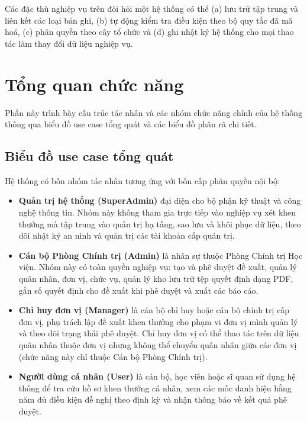 \documentclass[../DoAn.tex]{subfiles}
\begin{document}
Các đặc thù nghiệp vụ trên đòi hỏi một hệ thống có thể (a) lưu trữ tập trung và liên kết các loại bản ghi, (b) tự động kiểm tra điều kiện theo bộ quy tắc đã mã hoá, (c) phân quyền theo cây tổ chức và (d) ghi nhật ký hệ thống cho mọi thao tác làm thay đổi dữ liệu nghiệp vụ.

\section{Tổng quan chức năng}
\label{section:2.2}

Phần này trình bày cấu trúc tác nhân và các nhóm chức năng chính của hệ thống thông qua biểu đồ use case tổng quát và các biểu đồ phân rã chi tiết.

\subsection{Biểu đồ use case tổng quát}
\label{subsection:2.2.1}

Hệ thống có bốn nhóm tác nhân tương ứng với bốn cấp phân quyền nội bộ:

\begin{itemize}
    \item \textbf{Quản trị hệ thống (SuperAdmin)} đại diện cho bộ phận kỹ thuật và công nghệ thông tin. Nhóm này không tham gia trực tiếp vào nghiệp vụ xét khen thưởng mà tập trung vào quản trị hạ tầng, sao lưu và khôi phục dữ liệu, theo dõi nhật ký an ninh và quản trị các tài khoản cấp quản trị.
    \item \textbf{Cán bộ Phòng Chính trị (Admin)} là nhân sự thuộc Phòng Chính trị Học viện. Nhóm này có toàn quyền nghiệp vụ: tạo và phê duyệt đề xuất, quản lý quân nhân, đơn vị, chức vụ, quản lý kho lưu trữ tệp quyết định dạng PDF, gắn số quyết định cho đề xuất khi phê duyệt và xuất các báo cáo.
    \item \textbf{Chỉ huy đơn vị (Manager)} là cán bộ chỉ huy hoặc cán bộ chính trị cấp đơn vị, phụ trách lập đề xuất khen thưởng cho phạm vi đơn vị mình quản lý và theo dõi trạng thái phê duyệt. Chỉ huy đơn vị có thể thao tác trên dữ liệu quân nhân thuộc đơn vị nhưng không thể chuyển quân nhân giữa các đơn vị (chức năng này chỉ thuộc Cán bộ Phòng Chính trị).
    \item \textbf{Người dùng cá nhân (User)} là cán bộ, học viên hoặc sĩ quan sử dụng hệ thống để tra cứu hồ sơ khen thưởng cá nhân, xem các mốc danh hiệu hằng năm đủ điều kiện đề nghị theo định kỳ và nhận thông báo về kết quả phê duyệt.
\end{itemize}
\end{document}
